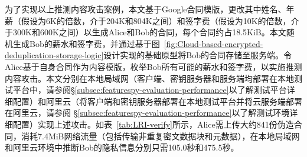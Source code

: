 为了实现以上推测内容攻击案例，本文基于Google合同模版\cite{GoogleOffer}，更改其中姓名、年薪（假设为6K的倍数\cite{harnik2010side}，介于204K和804K之间）和签字费（假设为10K的倍数，介于300K和600K之间）以生成Alice和Bob的合同，每个合同约占18.5KiB。本文随机生成Bob的薪水和签字费，并通过基于图~\ref{fig:Cloud-based-encrypted-deduplication-storage-logic}设计实现的基础原型将Bob的合同存储至服务端。令Alice基于自身合同作为内容模版，枚举Bob所有可能的薪水和签字费，以实施推测内容攻击。本文分别在本地局域网（客户端、密钥服务器和服务端均部署在本地测试平台中，请参阅\S\ref{subsec:featurespy-evaluation-performance}以了解测试平台详细配置）和阿里云（将客户端和密钥服务器部署在本地测试平台并将云服务端部署在阿里云\cite{Alibaba}，请参阅 \S\ref{subsec:featurespy-evaluation-performance}以了解测试环境详细配置）实现上述攻击。如表~\ref{tab:LRI-verify}所示，Alice需上传大约841份伪造合同，消耗7.4MiB网络流量（包括传输非重复密文数据块和元数据），在本地局域网和阿里云环境中推断Bob的隐私信息分别只需105.0秒和475.5秒。

